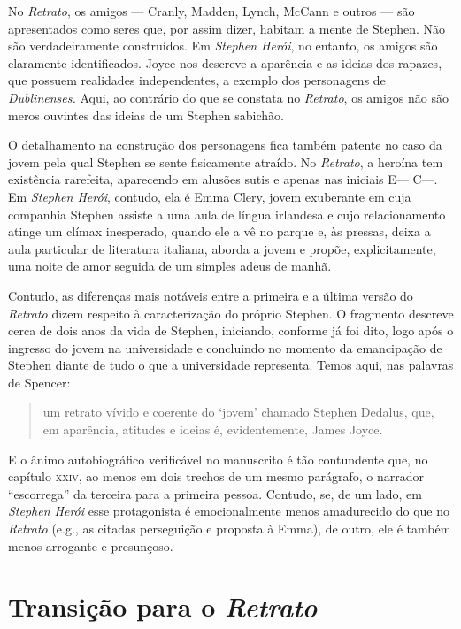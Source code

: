 No \textit{Retrato}, os amigos --- Cranly, Madden, Lynch, McCann e
outros --- são apresentados como seres que, por assim dizer, habitam a
mente de Stephen.  Não são verdadeiramente construídos.  Em
\textit{Stephen Herói}, no entanto, os amigos são claramente
identificados.  Joyce nos descreve a aparência e as ideias dos rapazes,
que possuem realidades independentes, a exemplo dos personagens de
\textit{Dublinenses.}  Aqui, ao contrário do que se constata no
\textit{Retrato}, os amigos não são meros ouvintes das ideias
de um Stephen sabichão.

O detalhamento na construção dos personagens fica também patente no
caso da jovem pela qual Stephen se sente fisicamente atraído.  No	
\textit{Retrato}, a heroína tem existência rarefeita, aparecendo em
alusões sutis e apenas nas iniciais E--- C---.  Em
\textit{Stephen Herói}, contudo, ela é Emma Clery, jovem exuberante em
cuja companhia Stephen assiste a uma aula de língua irlandesa e cujo
relacionamento atinge um clímax inesperado, quando ele a vê no parque
e, às pressas, deixa a aula particular de literatura italiana, aborda a
jovem e propõe, explicitamente, uma noite de amor seguida de um simples
adeus de manhã.

Contudo, as diferenças mais notáveis entre a primeira e a última
versão do \textit{Retrato} dizem respeito à caracterização do próprio
Stephen.  O fragmento descreve cerca de dois anos da vida de Stephen,
iniciando, conforme já foi dito, logo após o ingresso do jovem na
universidade e concluindo no momento da emancipação de Stephen diante
de tudo o que a universidade representa.  Temos aqui, nas palavras de
Spencer:

\begin{quote}
um retrato vívido e coerente do ‘jovem’ chamado Stephen
Dedalus, que, em aparência, atitudes e ideias é, evidentemente, James
Joyce.  
\end{quote}
 
E o ânimo autobiográfico verificável no manuscrito é tão		
contundente que, no capítulo \textsc{xxiv}, ao menos em dois trechos de um mesmo
parágrafo, o narrador “escorrega” da terceira para a primeira pessoa. 
Contudo, se, de um lado, em \textit{Stephen Herói} esse protagonista é
emocionalmente menos amadurecido do que no \textit{Retrato} (e.g., as
citadas perseguição e proposta à Emma), de outro, ele é também menos
arrogante e presunçoso.  


\section*{Transição para o \textit{Retrato}}

